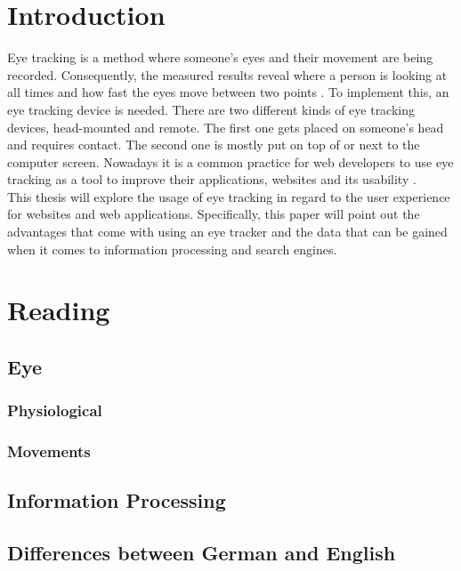 \section{Introduction}
\label{section:Introduction}
Eye tracking is a method where someone's eyes and their movement are being recorded. Consequently, the measured results reveal where a person is looking at all times and how fast the eyes move between two points \autocite[]{poole2006eye}. To implement this, an eye tracking device is needed. There are two different kinds of eye tracking devices, head-mounted and remote. The first one gets placed on someone's head and requires contact. The second one is mostly put on top of or next to the computer screen. 
Nowadays it is a common practice for web developers to use eye tracking as a tool to improve their applications, websites and its usability \autocite[]{buscher2009you}.\\

This thesis will explore the usage of eye tracking in regard to the user experience for websites and web applications. Specifically, this paper will point out the advantages that come with using an eye tracker and the data that can be gained when it comes to information processing and search engines. 

\section{Reading}
\label{section:Reading}

\subsection{Eye}
\label{subsection:Eye}

\subsubsection{Physiological}

\subsubsection{Movements}

\subsection{Information Processing}
\label{subsection:InformationProcessing}

\subsection{Differences between German and English}
\label{subsection:Differences}

